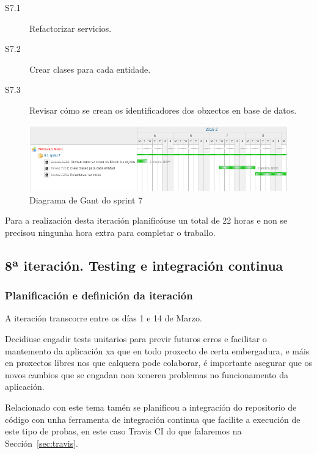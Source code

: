         \begin{description}
         \item [S7.1] Refactorizar servicios.
         \item [S7.2] Crear clases para cada entidade.
         \item [S7.3] Revisar cómo se crean os identificadores dos obxectos en 
base de datos.
        \end{description}

        \begin{figure}[h!]
          \begin{center}
          \includegraphics[width=\textwidth]{./img/gant_diagrams/07.png}
          \caption{Diagrama de Gant do sprint 7}
          \label{fig:gant07}
          \end{center}
        \end{figure}

    Para a realización desta iteración planificóuse un total de 22 horas e 
non se precisou ningunha hora extra para completar o traballo.

    \subsection{8ª iteración. Testing e integración continua}

      \subsubsection{Planificación e definición da iteración}
      A iteración transcorre entre os días 1 e 14 de Marzo.

      Decidiuse engadir tests unitarios para previr futuros erros e facilitar o 
mantemento da aplicación xa que en todo proxecto de certa embergadura, e máis 
en proxectos libres nos que calquera pode colaborar, é importante asegurar que 
os novos cambios que se engadan non xeneren problemas no funcionamento da 
aplicación.

      Relacionado con este tema tamén se planificou a integración do 
repositorio de código con unha ferramenta de integración continua que facilite 
a execución de este tipo de probas, en este caso Travis CI do que falaremos na 
Sección~\ref{sec:travis}.

